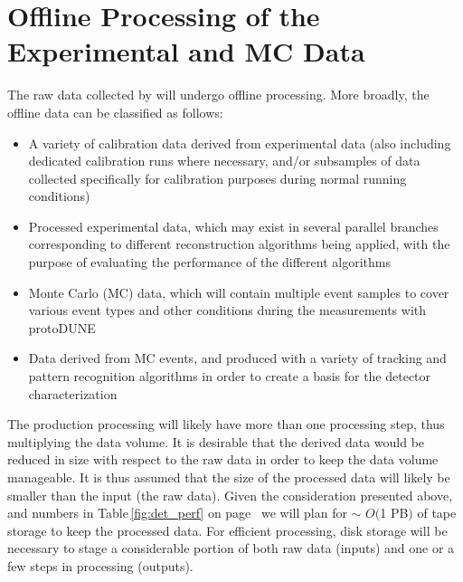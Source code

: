 \section{Offline Processing of the Experimental and MC Data}
\label{sec:protodune-offline}

The raw data collected by \pd will undergo offline processing. More broadly, the offline data
can be classified as follows:
\begin{itemize}

\item A variety of calibration data derived from experimental data (also including dedicated calibration
runs where necessary, and/or subsamples of data collected specifically for calibration
purposes during normal running conditions)

\item Processed experimental data, which may exist in several parallel branches corresponding to
different reconstruction algorithms being applied, with the purpose of evaluating the performance
of the different algorithms

\item Monte Carlo (MC) data, which will contain multiple event samples to cover various event types
and other conditions during the measurements with protoDUNE

\item Data derived from MC events, and produced with a variety of tracking and pattern recognition algorithms
in order to create a basis for the detector characterization

\end{itemize}

\noindent The production processing will likely have more than one processing step,
thus multiplying the data volume. It is desirable that the derived data would be reduced
in size with respect to the raw data in order to keep the data volume manageable.
It is thus assumed that the size of the processed data will likely be smaller than the input (the raw data). 
Given the consideration presented above, and numbers in Table\,\ref{fig:det_perf}
on page~\pageref{fig:det_perf} we will plan for
$\sim$ $O($1 PB$)$ of tape storage to keep the processed data. 
For efficient processing, disk storage will be necessary
to stage a considerable portion of both raw data (inputs) and one or a few steps in processing (outputs).

